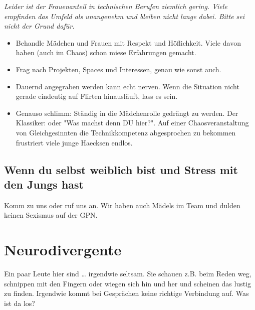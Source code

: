 \documentclass[10pt,notumble]{leaflet}
\newcommand\dos{\item[$+$]}
\newcommand\donts{\item[$-$]}
\begin{document}
\emph{Leider ist der Frauenanteil in technischen Berufen ziemlich
  gering. Viele empfinden das Umfeld als unangenehm und bleiben nicht
  lange dabei. Bitte sei nicht der Grund dafür.}

\label{sec-2-1}
\begin{itemize}
\dos Behandle Mädchen und Frauen mit Respekt und Höflichkeit. Viele davon
haben (auch im Chaos) schon miese Erfahrungen gemacht.
\dos Frag nach Projekten, Spaces und Interessen, genau wie sonst auch.
\label{sec-2-2}
\donts Dauernd angegraben werden kann echt nerven. Wenn die Situation
  nicht gerade eindeutig auf Flirten hinausläuft, lass es sein.
\donts Genauso schlimm: Ständig in die Mädchenrolle gedrängt zu
  werden. Der Klassiker: oder "Was machst denn DU hier?". Auf einer
  Chaosveranstaltung von Gleichgesinnten die Technikkompetenz
  abgesprochen zu bekommen frustriert viele junge Haecksen endlos.
\end{itemize}

\subsection{Wenn du selbst weiblich bist und Stress mit den Jungs hast}
Komm zu uns oder ruf uns an. Wir haben auch Mädels im Team und dulden
keinen Sexismus auf der GPN.


\section{Neurodivergente}
\label{sec-3}
Ein paar Leute hier sind \ldots{} irgendwie seltsam. Sie schauen
z.B. beim Reden weg, schnippen mit den Fingern oder wiegen sich hin
und her und scheinen das lustig zu finden. Irgendwie kommt bei
Gesprächen keine richtige Verbindung auf. Was ist da los?
\end{document}

